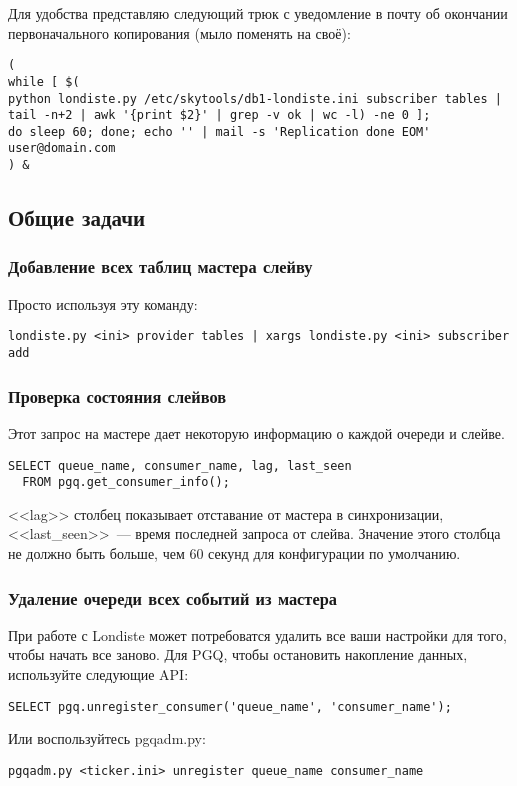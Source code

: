 Для удобства представляю следующий трюк с уведомление в почту об окончании
первоначального копирования (мыло поменять на своё):
\begin{verbatim}
(
while [ $(
python londiste.py /etc/skytools/db1-londiste.ini subscriber tables |
tail -n+2 | awk '{print $2}' | grep -v ok | wc -l) -ne 0 ];
do sleep 60; done; echo '' | mail -s 'Replication done EOM' user@domain.com
) &
\end{verbatim}


\subsection{Общие задачи}

\subsubsection{Добавление всех таблиц мастера слейву}
Просто используя эту команду:
\begin{verbatim}
londiste.py <ini> provider tables | xargs londiste.py <ini> subscriber add
\end{verbatim}

\subsubsection{Проверка состояния слейвов}
Этот запрос на мастере дает некоторую информацию о каждой очереди и слейве.
\begin{verbatim}
SELECT queue_name, consumer_name, lag, last_seen
  FROM pgq.get_consumer_info();
\end{verbatim}

<<lag>> столбец показывает отставание от мастера в синхронизации, 
<<last\_seen>>~--- время последней запроса от слейва. Значение этого столбца не должно быть больше, 
чем 60 секунд для конфигурации по умолчанию.

\subsubsection{Удаление очереди всех событий из мастера}
При работе с Londiste может потребоватся удалить все ваши настройки для того, чтобы начать все заново. 
Для PGQ, чтобы остановить накопление данных, используйте следующие API:
\begin{verbatim}
SELECT pgq.unregister_consumer('queue_name', 'consumer_name');
\end{verbatim}

Или воспользуйтесь pgqadm.py:
\begin{verbatim}
pgqadm.py <ticker.ini> unregister queue_name consumer_name
\end{verbatim}

